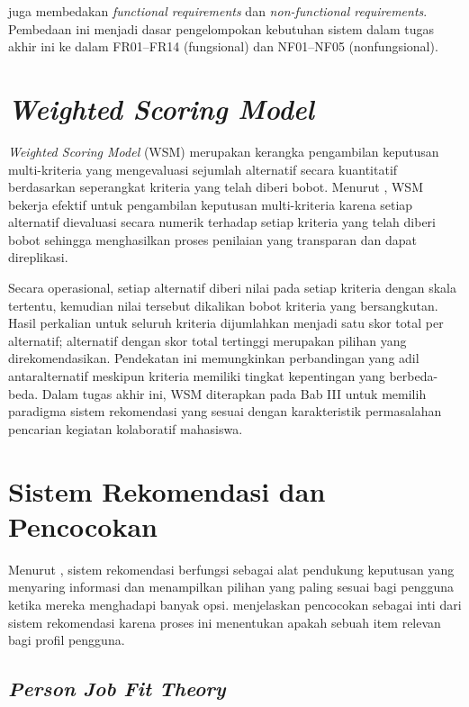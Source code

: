\textcite{sommerville2016} juga membedakan \emph{functional requirements} dan \emph{non-functional requirements}. Pembedaan ini menjadi dasar pengelompokan kebutuhan sistem dalam tugas akhir ini ke dalam FR01--FR14 (fungsional) dan NF01--NF05 (nonfungsional).

\section{\emph{Weighted Scoring Model}}

\emph{Weighted Scoring Model} (WSM) merupakan kerangka pengambilan keputusan multi-kriteria yang mengevaluasi sejumlah alternatif secara kuantitatif berdasarkan seperangkat kriteria yang telah diberi bobot. Menurut \textcite{kumar2022}, WSM bekerja efektif untuk pengambilan keputusan multi-kriteria karena setiap alternatif dievaluasi secara numerik terhadap setiap kriteria yang telah diberi bobot sehingga menghasilkan proses penilaian yang transparan dan dapat direplikasi.

Secara operasional, setiap alternatif diberi nilai pada setiap kriteria dengan skala tertentu, kemudian nilai tersebut dikalikan bobot kriteria yang bersangkutan. Hasil perkalian untuk seluruh kriteria dijumlahkan menjadi satu skor total per alternatif; alternatif dengan skor total tertinggi merupakan pilihan yang direkomendasikan. Pendekatan ini memungkinkan perbandingan yang adil antaralternatif meskipun kriteria memiliki tingkat kepentingan yang berbeda-beda. Dalam tugas akhir ini, WSM diterapkan pada Bab III untuk memilih paradigma sistem rekomendasi yang sesuai dengan karakteristik permasalahan pencarian kegiatan kolaboratif mahasiswa.

\section{Sistem Rekomendasi dan Pencocokan}

Menurut \textcite{ricci2011}, sistem rekomendasi berfungsi sebagai alat pendukung keputusan yang menyaring informasi dan menampilkan pilihan yang paling sesuai bagi pengguna ketika mereka menghadapi banyak opsi. \textcite{burke2002} menjelaskan pencocokan sebagai inti dari sistem rekomendasi karena proses ini menentukan apakah sebuah item relevan bagi profil pengguna.

\subsection{\emph{Person Job Fit Theory}}

